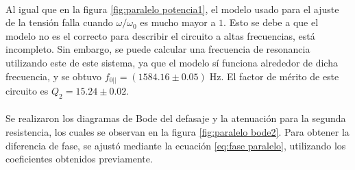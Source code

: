 \paragraph{}
Al igual que en la figura \ref{fig:paralelo potencia1}, el modelo usado para el ajuste de la tensión falla cuando $\omega/\omega_0$ es mucho mayor a $1$. Esto se debe a que el modelo no es el correcto para describir el circuito a altas frecuencias, está incompleto. Sin embargo, se puede calcular una frecuencia de resonancia utilizando este de este sistema, ya que el modelo sí funciona alrededor de dicha frecuencia, y se obtuvo $f_{0||}=(1584.16\pm 0.05)\;$Hz. El factor de mérito de este circuito es $Q_2=15.24\pm0.02$.
\paragraph{}
Se realizaron los diagramas de Bode del defasaje y la atenuación para la segunda resistencia, los cuales se observan en la figura \ref{fig:paralelo bode2}. Para obtener la diferencia de fase, se ajustó mediante la ecuación \eqref{eq:fase paralelo}, utilizando los coeficientes obtenidos previamente.
